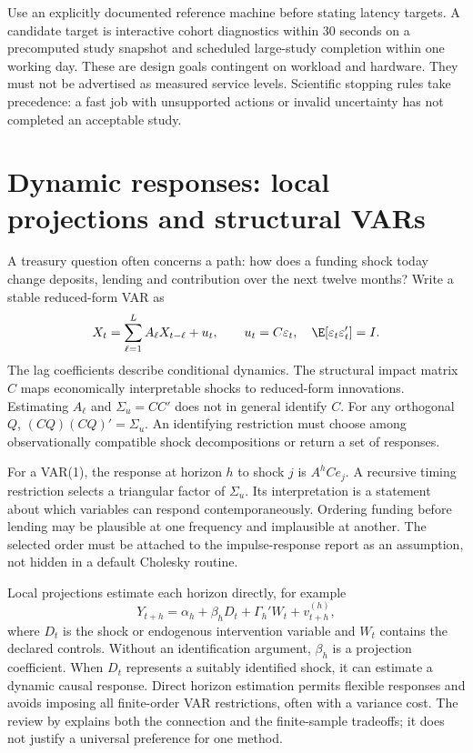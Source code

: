 Use an explicitly documented reference machine before stating latency
targets. A candidate target is interactive cohort diagnostics within 30
seconds on a precomputed study snapshot and scheduled large-study completion
within one working day. These are design goals contingent on workload and
hardware. They must not be advertised as measured service levels.
Scientific stopping rules take precedence: a fast job with unsupported
actions or invalid uncertainty has not completed an acceptable study.

\section{Dynamic responses: local projections and structural VARs}
A treasury question often concerns a path: how does a funding shock today
change deposits, lending and contribution over the next twelve months?
Write a stable reduced-form VAR as
\begin{equation}
 X_t=\sum_{\ell=1}^{L}A_\ell X_{t-\ell}+u_t,
 \qquad u_t=C\varepsilon_t,\quad
 \E[\varepsilon_t\varepsilon_t']=I.
 \label{eq:var}
\end{equation}
The lag coefficients describe conditional dynamics. The structural impact
matrix $C$ maps economically interpretable shocks to reduced-form
innovations. Estimating $A_\ell$ and $\Sigma_u=CC'$ does not in general
identify $C$. For any orthogonal $Q$, $(CQ)(CQ)'=\Sigma_u$.
An identifying restriction must choose among observationally compatible
shock decompositions or return a set of responses.

For a VAR(1), the response at horizon $h$ to shock $j$ is
$A^h C e_j$. A recursive timing restriction selects a triangular factor
of $\Sigma_u$. Its interpretation is a statement about which variables
can respond contemporaneously. Ordering funding before lending may be
plausible at one frequency and implausible at another. The selected order
must be attached to the impulse-response report as an assumption, not
hidden in a default Cholesky routine.

Local projections estimate each horizon directly, for example
\begin{equation}
 Y_{t+h}=\alpha_h+\beta_h D_t+\Gamma_h'W_t+v_{t+h}^{(h)},
 \label{eq:lp}
\end{equation}
where $D_t$ is the shock or endogenous intervention variable and $W_t$
contains the declared controls. Without an identification argument,
$\beta_h$ is a projection coefficient. When $D_t$ represents a suitably
identified shock, it can estimate a dynamic causal response. Direct horizon
estimation permits flexible responses and avoids imposing all finite-order
VAR restrictions, often with a variance cost. The review by
\citet{jorda2024} explains both the connection and the finite-sample
tradeoffs; it does not justify a universal preference for one method.

